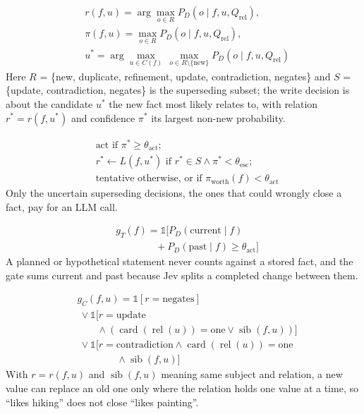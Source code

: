 \documentclass[11pt]{article}
\begin{document}
\begin{align}
& r(f,u) = \arg\max_{o \in R} P_D(o \mid f, u, Q_{\text{rel}}), \nonumber\\
& \pi(f,u) = \max_{o \in R} P_D(o \mid f, u, Q_{\text{rel}}), \nonumber\\
& u^{*} = \arg\max_{u \in C(f)}\, \max_{o \in R \setminus \{\text{new}\}} P_D(o \mid f, u, Q_{\text{rel}}) \label{eq:rel}
\end{align}
Here $R$ = \{new, duplicate, refinement, update, contradiction, negates\} and $S$ = \{update, contradiction, negates\} is the superseding subset; the write decision is about the candidate $u^{*}$ the new fact most likely relates to, with relation $r^{*} = r(f, u^{*})$ and confidence $\pi^{*}$ its largest non-new probability.

\begin{align}
& \text{act if } \pi^{*} \ge \theta_{\text{act}}; \nonumber\\
& r^{*} \leftarrow L(f, u^{*}) \text{ if } r^{*} \in S \wedge \pi^{*} < \theta_{\text{esc}}; \nonumber\\
& \text{tentative otherwise, or if } \pi_{\text{worth}}(f) < \theta_{\text{act}} \label{eq:zones}
\end{align}
Only the uncertain superseding decisions, the ones that could wrongly close a fact, pay for an LLM call.

\begin{align}
& g_T(f) = \mathbb{1}\bigl[P_D(\text{current} \mid f) \nonumber\\
& \qquad\qquad + P_D(\text{past} \mid f) \ge \theta_{\text{act}}\bigr] \label{eq:gtemp}
\end{align}
A planned or hypothetical statement never counts against a stored fact, and the gate sums current and past because Jev splits a completed change between them.

\begin{align}
& g_C(f,u) = \mathbb{1}[r = \text{negates}] \nonumber\\
& \ \vee \mathbb{1}\bigl[r = \text{update} \nonumber\\
& \qquad \wedge (\operatorname{card}(\operatorname{rel}(u)) = \text{one} \vee \operatorname{sib}(f,u))\bigr] \nonumber\\
& \ \vee \mathbb{1}\bigl[r = \text{contradiction} \wedge \operatorname{card}(\operatorname{rel}(u)) = \text{one} \nonumber\\
& \qquad\qquad \wedge \operatorname{sib}(f,u)\bigr] \label{eq:gcard}
\end{align}
With $r = r(f,u)$ and $\operatorname{sib}(f,u)$ meaning same subject and relation, a new value can replace an old one only where the relation holds one value at a time, so ``likes hiking'' does not close ``likes painting''.
\end{document}

